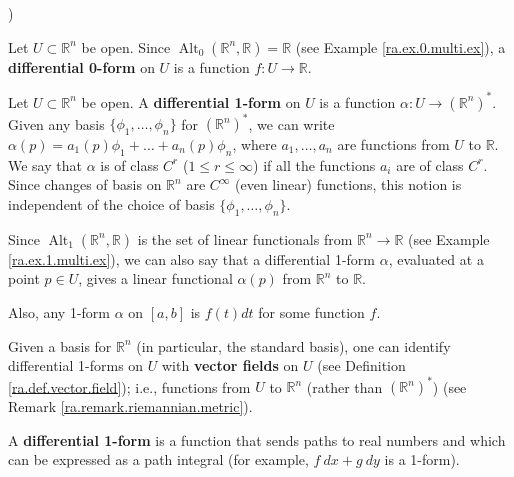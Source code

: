 \begin{example}\label{ra.ex.0.multi.form.ex})

Let \(U \subset \mathbb{R}^n\) be open. Since \(\operatorname{Alt}_0(\mathbb{R}^n, \mathbb{R}) = \mathbb{R}\) (see Example \ref{ra.ex.0.multi.ex}), a \textbf{differential 0-form} on \(U\) is a function \(f: U \to \mathbb{R}\).
\end{example}

\begin{example}\label{ra.ex.1.multi.form.ex}

Let \(U \subset \mathbb{R}^n\) be open. A \textbf{differential 1-form} on \(U\) is a function \(\alpha: U \to (\mathbb{R}^n)^*\). Given any basis \(\{\phi_1, \ldots, \phi_n\}\) for \((\mathbb{R}^n)^*\), we can write \(\alpha(p) = a_1(p) \phi_1 + \ldots + a_n(p) \phi_n\), where \(a_1, \ldots, a_n\) are functions from \(U\) to \(\mathbb{R}\). We say that \(\alpha\) is of class \(C^r\) (\(1 \leq r \leq \infty\)) if all the functions \(a_i\) are of class \(C^r\). Since changes of basis on \(\mathbb{R}^n\) are \(C^\infty\) (even linear) functions, this notion is independent of the choice of basis \(\{\phi_1, \ldots, \phi_n\}\).


Since \(\operatorname{Alt}_1(\mathbb{R}^n, \mathbb{R})\) is the set of linear functionals from \(\mathbb{R}^n \to \mathbb{R}\) (see Example \ref{ra.ex.1.multi.ex}), we can also say that a differential 1-form \(\alpha\), evaluated at a point \(p \in U\), gives a linear functional \(\alpha(p)\) from \(\mathbb{R}^n \) to \(\mathbb{R}\).

Also, any 1-form \(\alpha\) on \([a,b]\) is \(f(t) dt\) for some function \(f\).

Given a basis for \(\mathbb{R}^n\) (in particular, the standard basis), one can identify differential 1-forms on \(U\) with \textbf{vector fields} on \(U\) (see Definition \ref{ra.def.vector.field}); i.e., functions from \(U\) to \(\mathbb{R}^n\) (rather than \((\mathbb{R}^n)^*\)) (see Remark \ref{ra.remark.riemannian.metric}).

\end{example}

\begin{definition}

A \textbf{differential 1-form} is a function that sends paths to real numbers and which can be expressed as a path integral (for example, \(f \ dx + g \ dy\) is a 1-form).

\end{definition}

